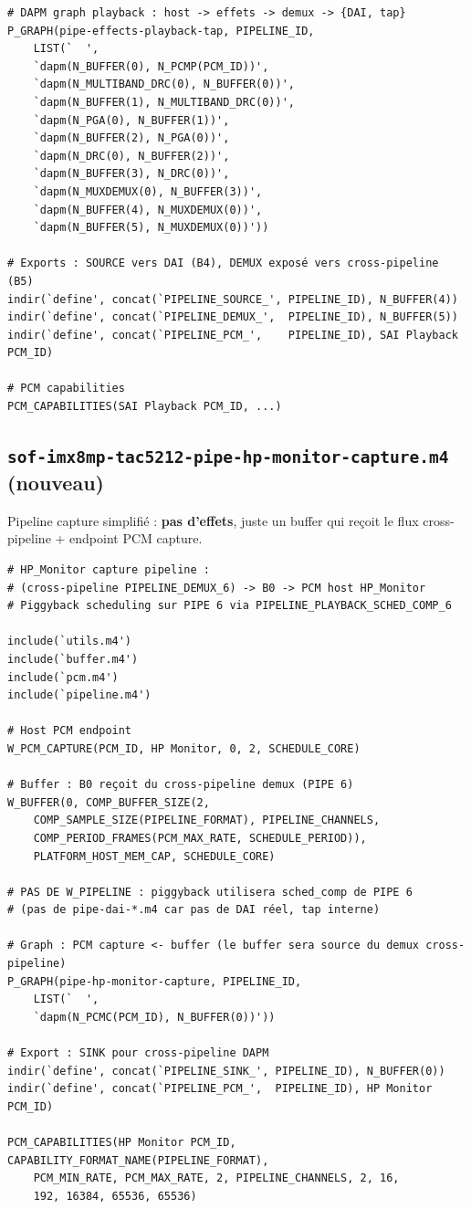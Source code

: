 \documentclass[11pt,a4paper]{article}
\begin{document}
\begin{lstlisting}[language={}, basicstyle=\ttfamily\scriptsize]
# DAPM graph playback : host -> effets -> demux -> {DAI, tap}
P_GRAPH(pipe-effects-playback-tap, PIPELINE_ID,
	LIST(`	',
	`dapm(N_BUFFER(0), N_PCMP(PCM_ID))',
	`dapm(N_MULTIBAND_DRC(0), N_BUFFER(0))',
	`dapm(N_BUFFER(1), N_MULTIBAND_DRC(0))',
	`dapm(N_PGA(0), N_BUFFER(1))',
	`dapm(N_BUFFER(2), N_PGA(0))',
	`dapm(N_DRC(0), N_BUFFER(2))',
	`dapm(N_BUFFER(3), N_DRC(0))',
	`dapm(N_MUXDEMUX(0), N_BUFFER(3))',
	`dapm(N_BUFFER(4), N_MUXDEMUX(0))',
	`dapm(N_BUFFER(5), N_MUXDEMUX(0))'))

# Exports : SOURCE vers DAI (B4), DEMUX exposé vers cross-pipeline (B5)
indir(`define', concat(`PIPELINE_SOURCE_', PIPELINE_ID), N_BUFFER(4))
indir(`define', concat(`PIPELINE_DEMUX_',  PIPELINE_ID), N_BUFFER(5))
indir(`define', concat(`PIPELINE_PCM_',    PIPELINE_ID), SAI Playback PCM_ID)

# PCM capabilities
PCM_CAPABILITIES(SAI Playback PCM_ID, ...)
\end{lstlisting}

\subsection{\texttt{sof-imx8mp-tac5212-pipe-hp-monitor-capture.m4} (nouveau)}

Pipeline capture simplifié : \textbf{pas d'effets}, juste un buffer qui reçoit le flux cross-pipeline + endpoint PCM capture.

\begin{lstlisting}[language={}, basicstyle=\ttfamily\scriptsize]
# HP_Monitor capture pipeline :
# (cross-pipeline PIPELINE_DEMUX_6) -> B0 -> PCM host HP_Monitor
# Piggyback scheduling sur PIPE 6 via PIPELINE_PLAYBACK_SCHED_COMP_6

include(`utils.m4')
include(`buffer.m4')
include(`pcm.m4')
include(`pipeline.m4')

# Host PCM endpoint
W_PCM_CAPTURE(PCM_ID, HP Monitor, 0, 2, SCHEDULE_CORE)

# Buffer : B0 reçoit du cross-pipeline demux (PIPE 6)
W_BUFFER(0, COMP_BUFFER_SIZE(2,
	COMP_SAMPLE_SIZE(PIPELINE_FORMAT), PIPELINE_CHANNELS,
	COMP_PERIOD_FRAMES(PCM_MAX_RATE, SCHEDULE_PERIOD)),
	PLATFORM_HOST_MEM_CAP, SCHEDULE_CORE)

# PAS DE W_PIPELINE : piggyback utilisera sched_comp de PIPE 6
# (pas de pipe-dai-*.m4 car pas de DAI réel, tap interne)

# Graph : PCM capture <- buffer (le buffer sera source du demux cross-pipeline)
P_GRAPH(pipe-hp-monitor-capture, PIPELINE_ID,
	LIST(`	',
	`dapm(N_PCMC(PCM_ID), N_BUFFER(0))'))

# Export : SINK pour cross-pipeline DAPM
indir(`define', concat(`PIPELINE_SINK_', PIPELINE_ID), N_BUFFER(0))
indir(`define', concat(`PIPELINE_PCM_',  PIPELINE_ID), HP Monitor PCM_ID)

PCM_CAPABILITIES(HP Monitor PCM_ID, CAPABILITY_FORMAT_NAME(PIPELINE_FORMAT),
	PCM_MIN_RATE, PCM_MAX_RATE, 2, PIPELINE_CHANNELS, 2, 16,
	192, 16384, 65536, 65536)
\end{lstlisting}
\end{document}
